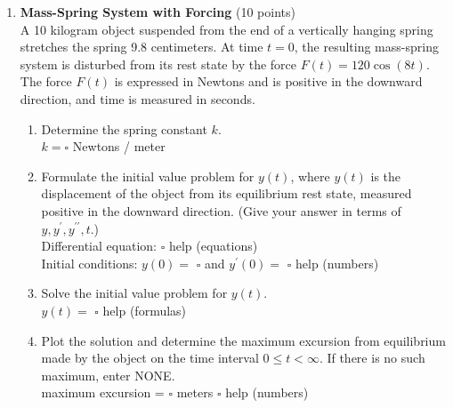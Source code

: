 \begin{enumerate}
  \item \textbf{Mass-Spring System with Forcing} (10 points)\\
  A 10 kilogram object suspended from the end of a vertically hanging spring stretches the spring 9.8 centimeters. At time $t=0$, the resulting mass-spring system is disturbed from its rest state by the force $F(t)=120 \cos (8 t)$. The force $F(t)$ is expressed in Newtons and is positive in the downward direction, and time is measured in seconds.
  \begin{enumerate}[label=\alph*]
    \item Determine the spring constant $k$.\\
    $k=\square$ Newtons / meter\\
    \begin{subanswer}
    \end{subanswer}
    \item Formulate the initial value problem for $y(t)$, where $y(t)$ is the displacement of the object from its equilibrium rest state, measured positive in the downward direction. (Give your answer in terms of $y, y^{\prime}, y^{\prime \prime}, t$.)\\
    Differential equation: $\square$ help (equations)\\
    Initial conditions: $y(0)=$ $\square$ and $y^{\prime}(0)=$ $\square$ help (numbers)\\
    \begin{subanswer}
    \end{subanswer}
    \item Solve the initial value problem for $y(t)$.\\
    $y(t)=$ $\square$ help (formulas)\\
    \begin{subanswer}
    \end{subanswer}
    \item Plot the solution and determine the maximum excursion from equilibrium made by the object on the time interval $0 \leq t<\infty$. If there is no such maximum, enter NONE.\\
    maximum excursion = $\square$ meters $\square$ help (numbers)\\
    \begin{subanswer}
    \end{subanswer}
  \end{enumerate}


\end{enumerate}
